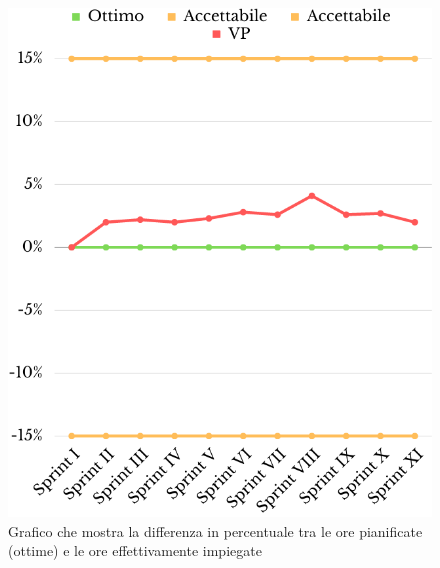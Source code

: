\begin{figure}[H]
	\centering
	\includegraphics[scale=0.5]{img/SV2.png}
	\caption{Grafico che mostra la differenza in percentuale tra le ore pianificate (ottime) e le ore effettivamente impiegate}
\end{figure}
